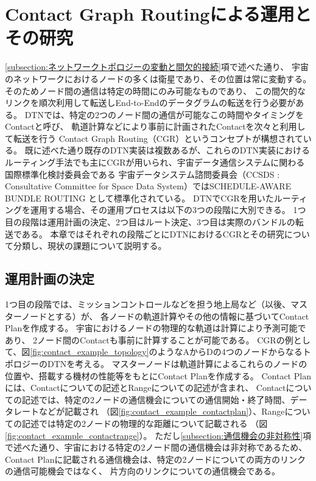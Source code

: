 \chapter{Contact Graph Routingによる運用とその研究}
\label{chap:DTNにおけるルーティングの研究と課題}

\ref{subsection:ネットワークトポロジーの変動と間欠的接続}項で述べた通り、
宇宙のネットワークにおけるノードの多くは衛星であり、その位置は常に変動する。
そのためノード間の通信は特定の時間にのみ可能なものであり、
この間欠的なリンクを順次利用して転送しEnd-to-Endのデータグラムの転送を行う必要がある。
DTNでは、特定の2つのノード間の通信が可能なこの時間やタイミングをContactと呼び、
軌道計算などにより事前に計画されたContactを次々と利用して転送を行う
Contact Graph Routing（CGR）\cite{Fraire2021}というコンセプトが構想されている。
既に述べた通り既存のDTN実装は複数あるが、これらのDTN実装における
ルーティング手法でも主にCGRが用いられ、宇宙データ通信システムに関わる国際標準化検討委員会である
宇宙データシステム諮問委員会（CCSDS : Consultative Committee 
for Space Data System）ではSCHEDULE-AWARE BUNDLE ROUTING
\cite{schedule_aware_bundle_routing}として標準化されている。
DTNでCGRを用いたルーティングを運用する場合、その運用プロセスは以下の3つの段階に大別できる。
1つ目の段階は運用計画の決定、2つ目はルート決定、3つ目は実際のバンドルの転送である。
本章ではそれぞれの段階ごとにDTNにおけるCGRとその研究について分類し、現状の課題について説明する。
\section{運用計画の決定}
\label{section:運用計画の決定}
1つ目の段階では、ミッションコントロールなどを担う地上局など（以後、マスターノードとする）が、
各ノードの軌道計算やその他の情報に基づいてContact Planを作成する。
宇宙におけるノードの物理的な軌道は計算により予測可能であり、
2ノード間のContactも事前に計算することが可能である。 
CGRの例として、図\ref{fig:contact_example_topology}のようなAからDの4つのノードからなるトポロジーのDTNを考える。
マスターノードは軌道計算によるこれらのノードの位置や、搭載する機材の性能等をもとにContact Planを作成する。
Contact Planには、Contactについての記述とRangeについての記述が含まれ、
Contactについての記述では、特定の2ノードの通信機会についての通信開始・終了時間、データレートなどが記載され
（図\ref{fig:contact_example_contactplan}）、Rangeについての記述では特定の2ノードの物理的な距離について記載される
（図\ref{fig:contact_example_contactrange}）。
ただし\ref{subsection:通信機会の非対称性}項で述べた通り、宇宙における特定の2ノード間の通信機会は非対称であるため、
Contact Planに記載される通信機会は、特定の2ノードについての両方のリンクの通信可能機会ではなく、
片方向のリンクについての通信機会である。

